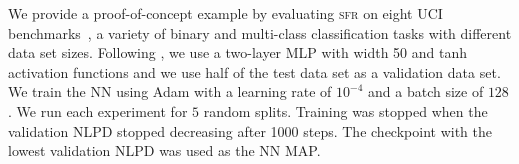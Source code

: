 \documentclass{article}
\newcommand{\our}{\textsc{sfr}\xspace}
\begin{document}

%

%
We provide a proof-of-concept example by evaluating \our on eight UCI benchmarks~\citep{UCI}, a variety of binary and multi-class classification tasks with different data set sizes.
Following \citet{immer2021improving}, we use a two-layer MLP with width 50 and tanh activation functions and we use half of the test data set as a validation data set.
We train the NN using Adam \cite{adam} with a learning rate of $10^{-4}$ and a batch size of $128$.
We run each experiment for $5$ random splits.
Training was stopped when the validation NLPD stopped decreasing after 1000 steps.
The checkpoint with the lowest validation NLPD was used as the NN MAP.
\end{document}
